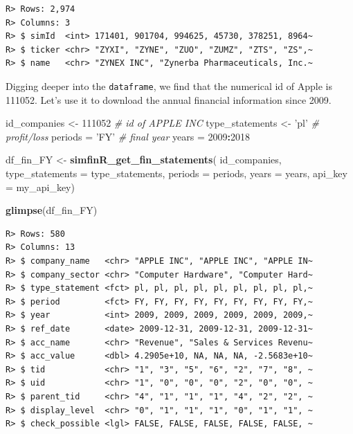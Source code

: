 \documentclass[
  12pt,
]{book}
\newenvironment{Shaded}{\begin{snugshade}}{\end{snugshade}}
\newcommand{\CommentTok}[1]{\textcolor[rgb]{0.37,0.37,0.37}{\textit{#1}}}
\newcommand{\DataTypeTok}[1]{\textcolor[rgb]{0.27,0.27,0.27}{#1}}
\newcommand{\DecValTok}[1]{\textcolor[rgb]{0.06,0.06,0.06}{#1}}
\newcommand{\KeywordTok}[1]{\textcolor[rgb]{0.27,0.27,0.27}{\textbf{#1}}}
\newcommand{\NormalTok}[1]{#1}
\newcommand{\OperatorTok}[1]{\textcolor[rgb]{0.43,0.43,0.43}{\textbf{#1}}}
\newcommand{\StringTok}[1]{\textcolor[rgb]{0.5,0.5,0.5}{#1}}
\begin{document}
\begin{verbatim}
R> Rows: 2,974
R> Columns: 3
R> $ simId  <int> 171401, 901704, 994625, 45730, 378251, 8964~
R> $ ticker <chr> "ZYXI", "ZYNE", "ZUO", "ZUMZ", "ZTS", "ZS",~
R> $ name   <chr> "ZYNEX INC", "Zynerba Pharmaceuticals, Inc.~
\end{verbatim}

Digging deeper into the \texttt{dataframe}, we find that the numerical id of Apple is 111052. Let's use it to download the annual financial information since 2009.

\begin{Shaded}
\begin{Highlighting}[]
\NormalTok{id_companies <-}\StringTok{ }\DecValTok{111052} \CommentTok{# id of APPLE INC}
\NormalTok{type_statements <-}\StringTok{ 'pl'} \CommentTok{# profit/loss}
\NormalTok{periods =}\StringTok{ 'FY'} \CommentTok{# final year}
\NormalTok{years =}\StringTok{ }\DecValTok{2009}\OperatorTok{:}\DecValTok{2018}

\NormalTok{df_fin_FY <-}\StringTok{ }\KeywordTok{simfinR_get_fin_statements}\NormalTok{(}
\NormalTok{  id_companies,}
  \DataTypeTok{type_statements =}\NormalTok{ type_statements,}
  \DataTypeTok{periods =}\NormalTok{ periods,}
  \DataTypeTok{years =}\NormalTok{ years,}
  \DataTypeTok{api_key =}\NormalTok{ my_api_key)}

\KeywordTok{glimpse}\NormalTok{(df_fin_FY)}
\end{Highlighting}
\end{Shaded}

\begin{verbatim}
R> Rows: 580
R> Columns: 13
R> $ company_name   <chr> "APPLE INC", "APPLE INC", "APPLE IN~
R> $ company_sector <chr> "Computer Hardware", "Computer Hard~
R> $ type_statement <fct> pl, pl, pl, pl, pl, pl, pl, pl, pl,~
R> $ period         <fct> FY, FY, FY, FY, FY, FY, FY, FY, FY,~
R> $ year           <int> 2009, 2009, 2009, 2009, 2009, 2009,~
R> $ ref_date       <date> 2009-12-31, 2009-12-31, 2009-12-31~
R> $ acc_name       <chr> "Revenue", "Sales & Services Revenu~
R> $ acc_value      <dbl> 4.2905e+10, NA, NA, NA, -2.5683e+10~
R> $ tid            <chr> "1", "3", "5", "6", "2", "7", "8", ~
R> $ uid            <chr> "1", "0", "0", "0", "2", "0", "0", ~
R> $ parent_tid     <chr> "4", "1", "1", "1", "4", "2", "2", ~
R> $ display_level  <chr> "0", "1", "1", "1", "0", "1", "1", ~
R> $ check_possible <lgl> FALSE, FALSE, FALSE, FALSE, FALSE, ~
\end{verbatim}
\end{document}
